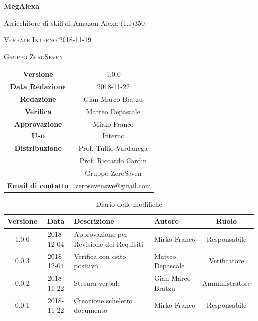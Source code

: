 \documentclass[a4paper,12pt]{article}
\author{Mirko Franco}
\date{2018-11-22}
\begin{document}
\begin{titlepage}
	\centering
	{\huge\bfseries MegAlexa\par}
	Arricchitore di skill di Amazon Alexa
	\line(1,0){350} \\
	{\scshape\LARGE Verbale Interno 2018-11-19 \par}
	\vspace{1cm}
	{\scshape Gruppo ZeroSeven \par}
	\logo
	\begin{tabular}{c|c}
		{\hfill \textbf{Versione}} 			& 1.0.0				\\
		{\hfill\textbf{Data Redazione}} 	& 2018-11-22		\\ 
		{\hfill\textbf{Redazione}} 			&  		Gian Marco Bratzu			\\ 
		{\hfill\textbf{Verifica}} 				&  		Matteo Depascale		\\ 
		{\hfill\textbf{Approvazione}} 		&  		Mirko Franco	\\ 
		{\hfill\textbf{Uso}} 					& 	Interno	\\ 
		{\hfill\textbf{Distribuzione}} 			& 			Prof. Tullio Vardanega \\ & Prof. Riccardo Cardin \\ & Gruppo ZeroSeven		\\ 
		{\hfill\textbf{Email di contatto}} & zerosevenswe@gmail.com \\
	\end{tabular}
\end{titlepage}
	

	
	\label{LastFrontPage}
	

	\newpage
	\cleardoublepage
	\begin{table}[tbph]
		\centering
		\begin{tabularx}{\textwidth}{|c|c|X|X|c|}
			\hline
			\textbf{Versione} & \textbf{Data} & \textbf{Descrizione} & \textbf{Autore} & \textbf{Ruolo} \\
			\hline
			1.0.0 & 2018-12-04 & Approvazione per Revisione dei Requisiti & Mirko Franco &  Responsabile \\
			\hline
			0.0.3 & 2018-12-04 & Verifica con esito positivo & Matteo Depascale & Verificatore \\
			\hline
			0.0.2 & 2018-11-22 & Stesura verbale & Gian Marco Bratzu & Amministratore \\
			\hline
			0.0.1 & 2018-11-22 & Creazione scheletro documento & Mirko Franco & Responsabile\\
			\hline
		\end{tabularx}
		\caption{Diario delle modifiche}
	\end{table}
	
\end{document}
